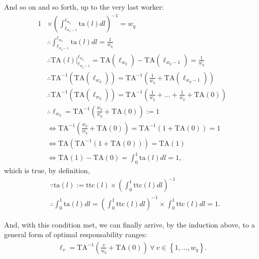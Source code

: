 \documentclass[hidelinks, nonatbib]{elsarticle}
\begin{document}
And so on and so forth, up to the very last worker:
\begin{align}
1 
&\times 
\left(
    \int_{\ell_{w_q - 1}}^{\ell_{w_q}}
    \text{ta}(l)
    dl
\right) ^ {-1}
=
w_q
\\
&\therefore
\int_{\ell_{w_q - 1}}^{\ell_{w_q}}
\text{ta}(l)
dl
=
\frac{1}{w_q}
\\
&\therefore
\text{TA}(l)
\big|_{\ell_{w_q - 1}}^{\ell_{w_q}}
=
\text{TA}(\ell_{w_q})
-
\text{TA}(\ell_{w_q - 1})
=
\frac{1}{w_q}
\\
&\therefore
\text{TA}^{-1}(
    \text{TA}(\ell_{w_q})
)
=
\text{TA}^{-1}\left(
    \frac{1}{w_q}
    +
    \text{TA}(\ell_{w_q - 1})
\right)
\\
&\therefore
\text{TA}^{-1}(
    \text{TA}(\ell_{w_q})
)
=
\text{TA}^{-1}\left(
    \frac{1}{w_q}
    +
    \dots
    +
    \frac{1}{w_q}
    +
    \text{TA}(0)
\right)
\\
&\therefore
\ell_{w_q}
=
\text{TA}^{-1}\left(
    \frac{w_q}{w_q}
    +
    \text{TA}(0)
\right)
:= 1
\\
&\iff
\text{TA}^{-1}\left(
    \frac{w_q}{w_q}
    +
    \text{TA}(0)
\right)
=
\text{TA}^{-1}\left(
    1
    +
    \text{TA}(0)
\right)
=
1
\\
&\iff
\text{TA}\left(
    \text{TA}^{-1}\left(
    1
    +
    \text{TA}(0)
\right)
\right)
=
\text{TA}(1)
\\
&\iff
\text{TA}(1)
-
\text{TA}(0)
=
\int_{0}^{1}{
    \text{ta}(l)
    dl
}
=
1
,
\end{align}
which is true, by definition,
\begin{align}
&\because
\text{ta}(l) 
:=
\text{ttc}(l)
\times
\left(
    \int_{0}^{1}{
        \text{ttc}(l)
        dl
    }
\right) ^ {-1}
\\
&\therefore
\int_{0}^{1}{
    \text{ta}(l)
    dl
}
=
\left(
    \int_{0}^{1}
    \text{ttc}(l)
    dl
\right) ^ {-1}
\times
\int_{0}^{1}{
    \text{ttc}(l)
    dl
}
=
1
.
\end{align}

And, with this condition met, we can finally arrive, by the induction above, to a general form of optimal responsability ranges:
\begin{gather}
\ell_v
=
\text{TA}^{-1}\left(
    \frac{v}{w_q}
    +
    \text{TA}(0)
\right)
\
\forall
\
v \in 
\left\{
    1, \dots, w_q
\right\}
.
\end{gather}
\end{document}
